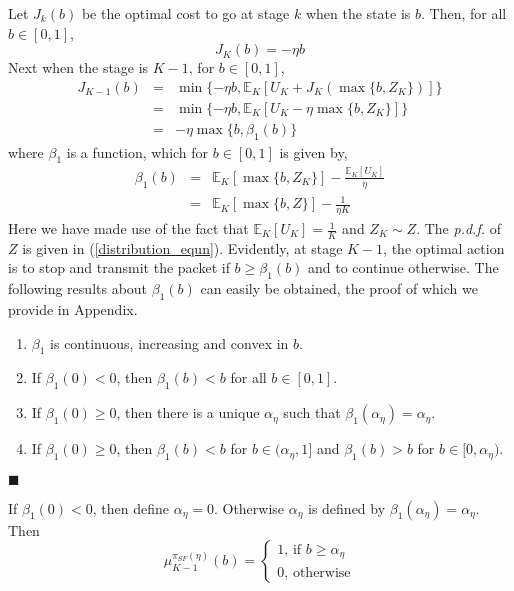 \documentclass[onecolumn]{IEEEtran}
\begin{document}
Let $J_k(b)$ be the optimal cost to go at stage $k$ when the state is
$b$. Then, for all $b \in [0,1]$,
\begin{equation}
	\label{expbell1_equn}
	J_{K}(b)=-\eta b	
\end{equation}
Next when the stage is $K-1$, for $b \in [0,1]$, 
\begin{eqnarray}
\label{expbell2_equn}
J_{K-1}(b)&=&\min\{-\eta b,\mathbb{E}_K\left[{U}_{K}+J_{K}(\max\{b,Z_{K}\}) \right]\}\nonumber\\
&=&\min\{-\eta b, \mathbb{E}_K\left[{U}_{K}-\eta\max\{b,Z_{K}\}\right]\}\nonumber\\
&=&-\eta\max\{b,\beta_1(b)\}
\end{eqnarray}
where $\beta_1$ is a function, which for $b\in[0,1]$ is given by, 
\begin{eqnarray}
	\label{beta1_equn}
 	\beta_1(b)&=&\mathbb{E}_K[\max\{b,Z_K\}]-\frac{\mathbb{E}_K[{U}_K]}{\eta}\nonumber\\
&=&\mathbb{E}_K[\max\{b,Z\}]-\frac{1}{\eta K}
\end{eqnarray}	
Here we have made use of the fact that
$\mathbb{E}_K[{U}_{K}]=\frac{1}{K}$ and $Z_{K}\sim Z$. The \emph{p.d.f.} of
$Z$ is given in (\ref{distribution_equn}).  Evidently, at
stage $K-1$, the optimal action is to stop and transmit the packet if
$b \ge \beta_1(b)$ and to continue otherwise.
The following results about $\beta_1(b)$ can easily be obtained, the proof of which we provide in Appendix.
\begin{lemma}
  \label{lem:beta_properties}
  \begin{enumerate}
  \item $\beta_1$ is continuous, increasing and convex in $b$.
  \item If $\beta_1(0)<0$, then $\beta_1(b)<b$ for all $b\in[0,1]$.
  \item If $\beta_1(0)\ge 0$, then there is a unique $\alpha_{\eta}$
    such that $\beta_1(\alpha_{\eta})=\alpha_{\eta}$.
  \item If $\beta_1(0)\ge0$, then $\beta_1(b)<b$ for
    $b\in(\alpha_\eta,1]$ and $\beta_1(b)>b$ for
    $b\in[0,\alpha_\eta)$.
  \end{enumerate}
\hfill $\blacksquare$
\end{lemma}
If $\beta_1(0)<0$, then define $\alpha_\eta=0$. Otherwise
$\alpha_\eta$ is defined by $\beta_1(\alpha_\eta)=\alpha_\eta$. Then
\begin{equation*}
\mu^{\pi_{SF}(\eta)}_{K-1}(b)=\left\{\begin{array}{ll}
                                    	1 \mbox{, if } b\ge\alpha_\eta\\
                                    	0 \mbox{, otherwise}\end{array}\right.
\end{equation*}
\end{document}
